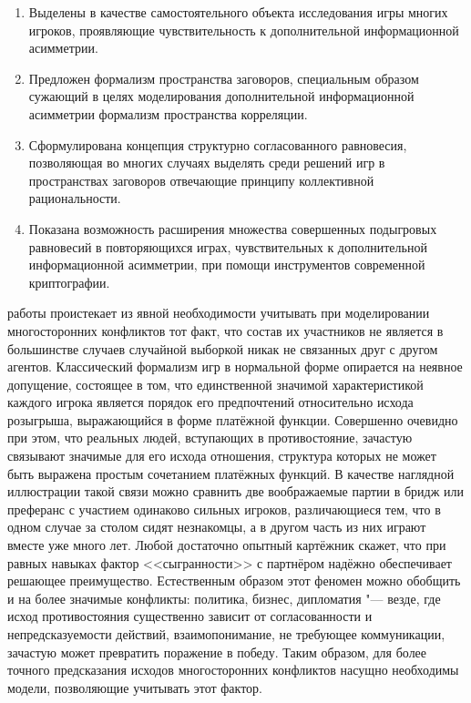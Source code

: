 {\novelty}
\begin{enumerate}[beginpenalty=10000] %
  \item Выделены в качестве самостоятельного объекта исследования игры многих игроков, проявляющие чувствительность к дополнительной информационной асимметрии.
  \item Предложен формализм пространства заговоров, специальным образом сужающий в целях моделирования дополнительной информационной асимметрии формализм пространства корреляции.
  \item Сформулирована концепция структурно согласованного равновесия, позволяющая во многих случаях выделять среди решений игр в пространствах заговоров отвечающие принципу коллективной рациональности.
  \item Показана возможность расширения множества совершенных подыгровых равновесий в повторяющихся играх, чувствительных к дополнительной информационной асимметрии, при помощи инструментов современной криптографии.
\end{enumerate}

{\influence} работы проистекает из явной необходимости учитывать при моделировании многосторонних конфликтов тот факт, что состав их участников не является в большинстве случаев случайной выборкой никак не связанных друг с другом агентов. Классический формализм игр в нормальной форме опирается на неявное допущение, состоящее в том, что единственной значимой характеристикой каждого игрока является порядок его предпочтений относительно исхода розыгрыша, выражающийся в форме платёжной функции. Совершенно очевидно при этом, что реальных людей, вступающих в противостояние, зачастую связывают значимые для его исхода отношения, структура которых не может быть выражена простым сочетанием платёжных функций. \ifsynopsis\else В качестве наглядной иллюстрации такой связи можно сравнить две воображаемые партии в бридж или преферанс с участием одинаково сильных игроков, различающиеся тем, что в одном случае за столом сидят незнакомцы, а в другом часть из них играют вместе уже много лет. Любой достаточно опытный картёжник скажет, что при равных навыках фактор <<сыгранности>> с партнёром надёжно обеспечивает решающее преимущество. Естественным образом этот феномен можно обобщить и на более значимые конфликты: политика, бизнес, дипломатия "--- везде, где исход противостояния существенно зависит от согласованности и непредсказуемости действий, взаимопонимание, не требующее коммуникации, зачастую может превратить поражение в победу. \fi Таким образом, для более точного предсказания исходов многосторонних конфликтов насущно необходимы модели, позволяющие учитывать этот фактор.

